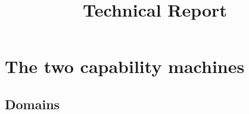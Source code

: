 \documentclass[a4paper]{article}
\title{Technical Report}
\begin{document}
\maketitle
\tableofcontents
\section{The two capability machines}
\subsection{Domains}
\label{sec:domains}

\end{document}
